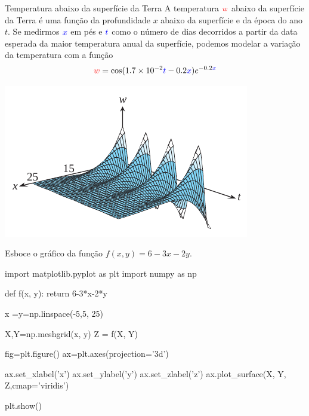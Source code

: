 \begin{frame}[label=funcoes]
	
	\begin{block}{Temperatura abaixo da superfície da Terra}
 A temperatura ${\color{red}w}$ abaixo da superfície da Terra é uma função da profundidade $x$ abaixo da superfície e da época do ano $t$. Se medirmos ${\color{blue}x}$ em pés e ${\color{blue}t}$ como o número de dias decorridos a partir da data esperada da maior temperatura anual da superfície, podemos modelar a variação da temperatura com a função
 \[{\color{red}w}=\cos(1.7\times 10^{-2}{\color{blue}t}-0.2 {\color{blue}x})e^{-0.2 {\color{blue}x}}\]
	\end{block}
	
	

\begin{center}
	\includegraphics[scale=0.5]{figuras/grafico-2.png}
\end{center}
	
\end{frame}

\begin{frame}[label=funcoes]
\begin{exe}
	Esboce o gráfico da função  $f(x,y)=6-3x-2y$.
\end{exe}
\end{frame}

\begin{frame}[label=funcoes, fragile=singleslide]
\begin{block}{ }
\begin{scriptsize}
\begin{pyverbatim}
import matplotlib.pyplot as plt
import numpy as np

def f(x, y):
    return 6-3*x-2*y

x =y=np.linspace(-5,5, 25)

X,Y=np.meshgrid(x, y)
Z = f(X, Y)

fig=plt.figure()
ax=plt.axes(projection='3d')

ax.set_xlabel('x')
ax.set_ylabel('y')
ax.set_zlabel('z')
ax.plot_surface(X, Y, Z,cmap='viridis')

plt.show()
\end{pyverbatim}
\end{scriptsize}
\end{block}



\end{frame}

